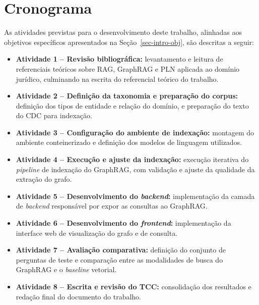 \section{Cronograma}
\label{sec-intro-crono}

As atividades previstas para o desenvolvimento deste trabalho, alinhadas aos
objetivos específicos apresentados na Seção~\ref{sec-intro-obj}, são descritas
a seguir:

\begin{itemize}
    \item \textbf{Atividade 1 -- Revisão bibliográfica:} levantamento e
    leitura de referenciais teóricos sobre RAG, GraphRAG e PLN aplicada ao
    domínio jurídico, culminando na escrita do referencial teórico do
    trabalho.

    \item \textbf{Atividade 2 -- Definição da taxonomia e preparação do
    corpus:} definição dos tipos de entidade e relação do domínio, e
    preparação do texto do CDC para indexação.

    \item \textbf{Atividade 3 -- Configuração do ambiente de indexação:}
    montagem do ambiente conteinerizado e definição dos modelos de linguagem
    utilizados.

    \item \textbf{Atividade 4 -- Execução e ajuste da indexação:} execução
    iterativa do \textit{pipeline} de indexação do GraphRAG, com validação e
    ajuste da qualidade da extração do grafo.

    \item \textbf{Atividade 5 -- Desenvolvimento do \textit{backend}:}
    implementação da camada de \textit{backend} responsável por expor as
    consultas ao GraphRAG.

    \item \textbf{Atividade 6 -- Desenvolvimento do \textit{frontend}:}
    implementação da interface web de visualização do grafo e de consulta.

    \item \textbf{Atividade 7 -- Avaliação comparativa:} definição do
    conjunto de perguntas de teste e comparação entre as modalidades de busca
    do GraphRAG e o \textit{baseline} vetorial.

    \item \textbf{Atividade 8 -- Escrita e revisão do TCC:} consolidação dos
    resultados e redação final do documento do trabalho.
\end{itemize}

